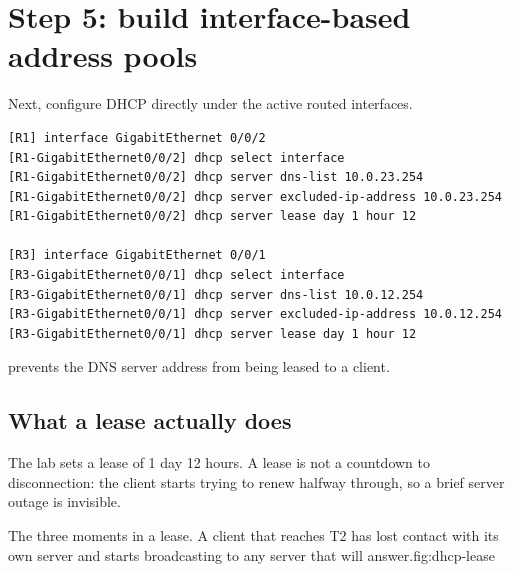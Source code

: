 \section{Step 5: build interface-based address pools}
Next, configure DHCP directly under the active routed interfaces.
\begin{lstlisting}[style=utpterminal]
[R1] interface GigabitEthernet 0/0/2
[R1-GigabitEthernet0/0/2] dhcp select interface
[R1-GigabitEthernet0/0/2] dhcp server dns-list 10.0.23.254
[R1-GigabitEthernet0/0/2] dhcp server excluded-ip-address 10.0.23.254
[R1-GigabitEthernet0/0/2] dhcp server lease day 1 hour 12

[R3] interface GigabitEthernet 0/0/1
[R3-GigabitEthernet0/0/1] dhcp select interface
[R3-GigabitEthernet0/0/1] dhcp server dns-list 10.0.12.254
[R3-GigabitEthernet0/0/1] dhcp server excluded-ip-address 10.0.12.254
[R3-GigabitEthernet0/0/1] dhcp server lease day 1 hour 12
\end{lstlisting}

\begin{keyidea}
 prevents the DNS server address from being leased to a client.
\end{keyidea}

\subsection{What a lease actually does}
The lab sets a lease of 1 day 12 hours. A lease is not a countdown to
disconnection: the client starts trying to renew halfway through, so a
brief server outage is invisible.

\begin{utpfig}{The three moments in a lease. A client that
reaches T2 has lost contact with its own server and starts broadcasting to any
server that will answer.}{fig:dhcp-lease}
\end{utpfig}

